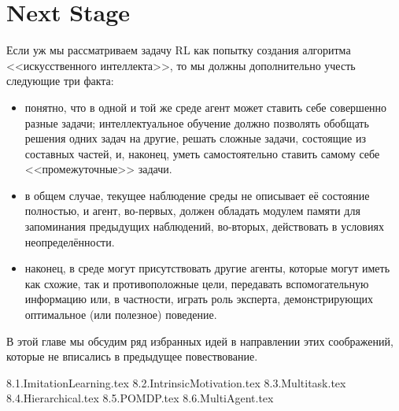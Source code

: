 \documentclass[../main.tex]{subfiles}
\begin{document}
\chapter{Next Stage}

Если уж мы рассматриваем задачу RL как попытку создания алгоритма <<искусственного интеллекта>>, то мы должны дополнительно учесть следующие три факта:
\begin{itemize}
    \item понятно, что в одной и той же среде агент может ставить себе совершенно разные задачи; интеллектуальное обучение должно позволять обобщать решения одних задач на другие, решать сложные задачи, состоящие из составных частей, и, наконец, уметь самостоятельно ставить самому себе <<промежуточные>> задачи.
    \item в общем случае, текущее наблюдение среды не описывает её состояние полностью, и агент, во-первых, должен обладать модулем памяти для запоминания предыдущих наблюдений, во-вторых, действовать в условиях неопределённости.
    \item наконец, в среде могут присутствовать другие агенты, которые могут иметь как схожие, так и противоположные цели, передавать вспомогательную информацию или, в частности, играть роль эксперта, демонстрирующих оптимальное (или полезное) поведение.
\end{itemize}
В этой главе мы обсудим ряд избранных идей в направлении этих соображений, которые не вписались в предыдущее повествование. 

{8.1.ImitationLearning.tex}
{8.2.IntrinsicMotivation.tex}
{8.3.Multitask.tex}
{8.4.Hierarchical.tex}
{8.5.POMDP.tex}
{8.6.MultiAgent.tex}
\end{document}
